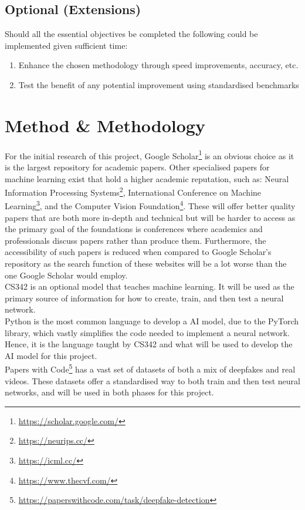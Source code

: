 \subsection{Optional (Extensions)}
Should all the essential objectives be completed the following could be implemented given sufficient time:
\begin{enumerate}
    \item Enhance the chosen methodology through speed improvements, accuracy, etc.
    \item Test the benefit of any potential improvement using standardised benchmarks
\end{enumerate}

\section{Method \& Methodology}

For the initial research of this project, Google Scholar\footnote{\url{https://scholar.google.com/}} is an obvious choice as it is the largest repository for academic papers. Other specialised papers for machine learning exist that hold a higher academic reputation, such as: Neural Information Processing Systems\footnote{\url{https://neurips.cc/}},  International Conference on Machine Learning\footnote{\url{https://icml.cc/}}, and the Computer Vision Foundation\footnote{\url{https://www.thecvf.com/}}. These will offer better quality papers that are both more in-depth and technical but will be harder to access as the primary goal of the foundations is conferences where academics and professionals discuss papers rather than produce them. Furthermore, the accessibility of such papers is reduced when compared to Google Scholar's repository as the search function of these websites will be a lot worse than the one Google Scholar would employ.\\

CS342 is an optional model that teaches machine learning. It will be used as the primary source of information for how to create, train, and then test a neural network.\\

Python is the most common language to develop a AI model, due to the PyTorch library, which vastly simplifies the code needed to implement a neural network. Hence, it is the language taught by CS342 and what will be used to develop the AI model for this project.\\

Papers with Code\footnote{\url{https://paperswithcode.com/task/deepfake-detection}} has a vast set of datasets of both a mix of deepfakes and real videos. These datasets offer a standardised way to both train and then test neural networks, and will be used in both phases for this project.\\

